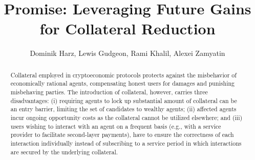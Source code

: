 \documentclass[runningheads]{llncs}
\newcommand{\sys}{Promise\xspace}
\newcommand{\dom}[1]{\todo[linecolor=green,backgroundcolor=green!25,bordercolor=green,inline,caption={}]{Comment by Dominik: #1}}
\begin{document}
\title{
\sys: Leveraging Future Gains for Collateral Reduction
} 
\author{
Dominik Harz, Lewis Gudgeon, Rami Khalil, Alexei Zamyatin
}


\date{}
\maketitle


\begin{abstract}
Collateral employed in cryptoeconomic protocols protects against the misbehavior of economically rational agents, compensating honest users for damages and punishing misbehaving parties.
The introduction of collateral, however, carries three disadvantages: (i) requiring agents to lock up substantial amount of collateral can be an entry barrier, limiting the set of candidates to wealthy agents; (ii) affected agents incur ongoing opportunity costs as the collateral cannot be utilized elsewhere; and (iii) users wishing to interact with an agent on a frequent basis (e.g., with a service provider to facilitate second-layer payments), have to ensure the correctness of each interaction individually instead of subscribing to a service period in which interactions are secured by the underlying collateral.


\end{abstract}
\end{document}
